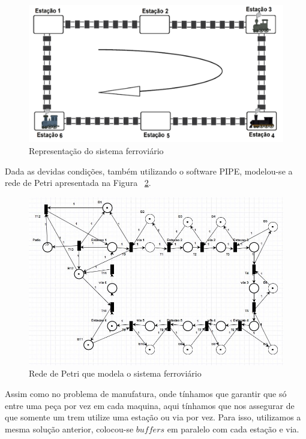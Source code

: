\documentclass[a4paper,12pt]{article}
\begin{document}
\begin{figure}[H]
	\begin{center}
		\includegraphics[width=0.8\linewidth]{tremmol.png}
	\end{center}
	\caption{Representação do sistema ferroviário}
	\label{fig:tremmol}
\end{figure}

Dada as devidas condições, também utilizando o software PIPE, modelou-se a rede de Petri apresentada na Figura ~\ref{fig:trem}.

\begin{figure}[H]
	\hspace{-0.8cm}
	\includegraphics[width=1.1\linewidth]{trem.JPG}
	\caption{Rede de Petri que modela o sistema ferroviário}
	\label{fig:trem}
\end{figure}

Assim como no problema de manufatura, onde tínhamos que garantir que só entre uma peça por vez em cada maquina, aqui tínhamos que nos assegurar de que somente um trem utilize uma estação ou via por vez. Para isso, utilizamos a mesma solução anterior, colocou-se $buffers$ em paralelo com cada estação e via.
\end{document}
